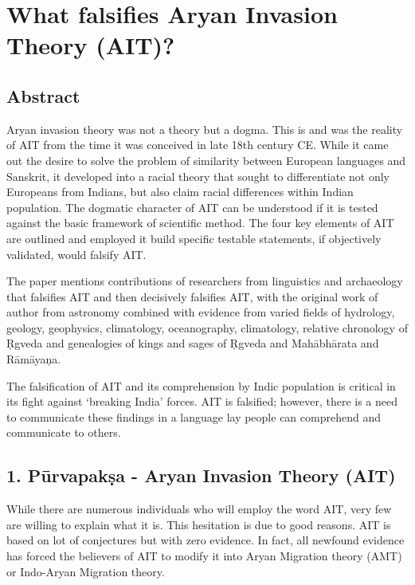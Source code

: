 
\chapter{What falsifies Aryan Invasion Theory (AIT)?}\label{chap08}



\section*{Abstract}

Aryan invasion theory was not a theory but a dogma. This is and was the reality of AIT from the time it was conceived in late 18th century CE. While it came out the desire to solve the problem of similarity between European languages and Sanskrit, it developed into a racial theory that sought to differentiate not only Europeans from Indians, but also claim racial differences within Indian population. The dogmatic character of AIT can be understood if it is tested against the basic framework of scientific method. The four key elements of AIT are outlined and employed it build specific testable statements, if objectively validated, would falsify AIT.

The paper mentions contributions of researchers from linguistics and archaeology that falsifies AIT and then decisively falsifies AIT, with the original work of author from astronomy combined with evidence from varied fields of hydrology, geology, geophysics, climatology, oceanography, climatology, relative chronology of Ṛgveda and genealogies of kings and sages of Ṛgveda and Mahābhārata and Rāmāyaņa.

The falsification of AIT and its comprehension by Indic population is critical in its fight against ‘breaking India’ forces. AIT is falsified; however, there is a need to communicate these findings in a language lay people can comprehend and communicate to others.


\section*{1. Pūrvapakṣa - Aryan Invasion Theory (AIT)}

While there are numerous individuals who will employ the word AIT, very few are willing to explain what it is. This hesitation is due to good reasons. AIT is based on lot of conjectures but with zero evidence. In fact, all newfound evidence has forced the believers of AIT to modify it into Aryan Migration theory (AMT) or Indo-Aryan Migration theory.


